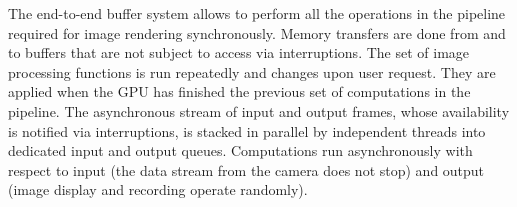 The end-to-end buffer system allows to perform all the operations in the pipeline required for image rendering synchronously. Memory transfers are done from and to buffers that are not subject to access via interruptions. The set of image processing functions is run repeatedly and changes upon user request. They are applied when the GPU has finished the previous set of computations in the pipeline. The asynchronous stream of input and output frames, whose availability is notified via interruptions, is stacked in parallel by independent threads into dedicated input and output queues. Computations run asynchronously with respect to input (the data stream from the camera does not stop) and output (image display and recording operate randomly).